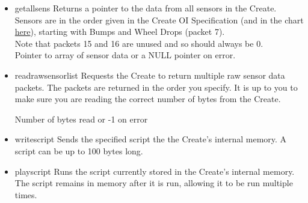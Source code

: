 \documentclass {article}
\begin{document}
\begin {itemize}
   \item {} {getallsens}
         Returns a pointer to the data from all sensors in the Create.  Sensors are in the order
         given in the Create OI Specification (and in the chart \hyperlink {oisensor}{here}),
         starting with Bumps and Wheel Drops (packet 7). \\
         Note that packets 15 and 16 are unused and so should always be 0. \\
         \ret Pointer to array of sensor data or a NULL pointer on error.

   \item {} {readrawsensorlist}
         Requests the Create to return multiple raw sensor data packets.  The packets are returned in
         the order you specify.  It is up to you to make sure you are reading the correct number of
         bytes from the Create. \\
         \ret Number of bytes read or -1 on error

   \item {} {writescript}
         Sends the specified script the the Create's internal memory.  A script can be up to 100
         bytes long. \\
         \retnorm

   \item {} {playscript}
         Runs the script currently stored in the Create's internal memory.  The script remains in
         memory after it is run, allowing it to be run multiple times. \\
         \retnorm


\end{itemize}
\end{document}
